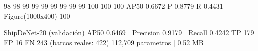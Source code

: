  98%
 98%
 99%
 99%
 99%
 99%
 99%
 99%
 99%
100%
100%
100%
   AP50 0.6672  P 0.8779  R 0.4431
Figure(1000x400)
100%

ShipDeNet-20 (validación)
  AP50 0.6469 | Precision 0.9179 | Recall 0.4242
  TP 179  FP 16  FN 243  (barcos reales: 422)
  112,709 parametros | 0.52 MB